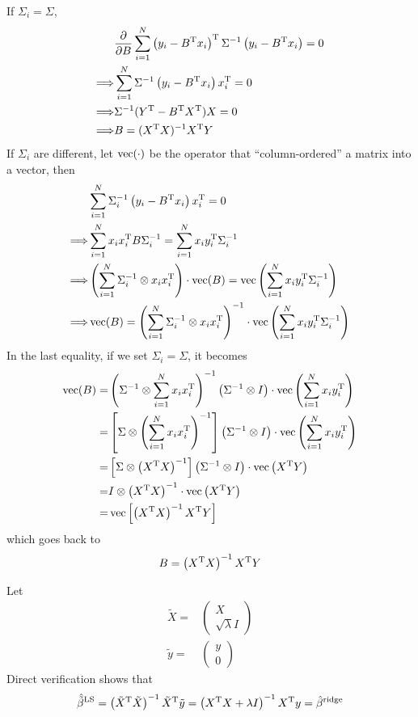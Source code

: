 \begin{sol}
If $\Sigma_i=\Sigma$,
\begin{align*}
& \frac{\partial}{\partial B}\sum_{i=1}^N\left(y_i-B^{\mathrm{T}}x_i\right)^{\mathrm{T}}\Sigma^{-1}\left(y_i-B^{\mathrm{T}}x_i\right)=0\\
\Longrightarrow & \sum_{i=1}^N\Sigma^{-1}\left(y_i-B^{\mathrm{T}}x_i\right)x_i^{\mathrm{T}}=0\\
\Longrightarrow & \Sigma^{-1}(Y^{\mathrm{T}}-B^{\mathrm{T}}X^{\mathrm{T}})X=0\\
\Longrightarrow & B=(X^{\mathrm{T}}X)^{-1}X^{\mathrm{T}}Y
\end{align*}
If $\Sigma_i$ are different, let $\operatorname{vec}(\cdot)$ be the operator that ``column-ordered'' a matrix into a vector, then
\begin{align*}
& \sum_{i=1}^N\Sigma_i^{-1}\left(y_i-B^{\mathrm{T}}x_i\right)x_i^{\mathrm{T}}=0\\
\Longrightarrow & \sum_{i=1}^{N}x_ix_i^{\mathrm{T}}B\Sigma_i^{-1}=\sum_{i=1}^{N}x_iy_i^{\mathrm{T}}\Sigma_i^{-1} \\
\Longrightarrow & \left(\sum_{i=1}^{N}\Sigma_i^{-1}\otimes x_ix_i^{\mathrm{T}}\right)\cdot\operatorname{vec}(B)=\operatorname{vec}\left(\sum_{i=1}^{N}x_iy_i^{\mathrm{T}}\Sigma_i^{-1}\right)\\
\Longrightarrow & \operatorname{vec}(B)=\left(\sum_{i=1}^{N}\Sigma_i^{-1}\otimes x_ix_i^{\mathrm{T}}\right)^{-1}\cdot\operatorname{vec}\left(\sum_{i=1}^{N}x_iy_i^{\mathrm{T}}\Sigma_i^{-1}\right)
\end{align*}
In the last equality, if we set $\Sigma_i=\Sigma$, it becomes
\begin{align*}
\operatorname{vec}(B) =& \left(\Sigma^{-1}\otimes\sum_{i=1}^{N}x_ix_i^{\mathrm{T}}\right)^{-1} \left(\Sigma^{-1}\otimes I\right)\cdot\operatorname{vec}\left(\sum_{i=1}^{N}x_iy_i^{\mathrm{T}}\right)\\
=& \left[\Sigma\otimes\left(\sum_{i=1}^{N}x_ix_i^{\mathrm{T}}\right)^{-1}\right] \left(\Sigma^{-1}\otimes I\right)\cdot\operatorname{vec}\left(\sum_{i=1}^{N}x_iy_i^{\mathrm{T}}\right)\\
=& \left[\Sigma\otimes\left(X^{\mathrm{T}}X\right)^{-1}\right] \left(\Sigma^{-1}\otimes I\right)\cdot\operatorname{vec}\left(X^{\mathrm{T}}Y\right)\\
=& I\otimes \left(X^{\mathrm{T}}X\right)^{-1}\cdot \operatorname{vec}\left(X^{\mathrm{T}}Y\right)\\
=& \operatorname{vec}\left[\left(X^{\mathrm{T}}X\right)^{-1}X^{\mathrm{T}}Y\right]
\end{align*}
which goes back to
\[
B=\left(X^{\mathrm{T}}X\right)^{-1}X^{\mathrm{T}}Y
\]
\end{sol}

\begin{sol}
Let
\begin{align*}
\tilde{X}=&\begin{pmatrix}
X\\
\sqrt{\lambda}I
\end{pmatrix}\\
\tilde{y}=&\begin{pmatrix}
y\\
0
\end{pmatrix}
\end{align*}
Direct verification shows that
\[
\hat{\tilde{\beta}}^{\mathrm{LS}}=\left(\tilde{X}^{\mathrm{T}}\tilde{X}\right)^{-1}\tilde{X}^{\mathrm{T}}\tilde{y}=\left(X^{\mathrm{T}}X+\lambda I\right)^{-1}X^{\mathrm{T}}y=\hat{\beta}^{\mathrm{ridge}}
\]
\end{sol}

